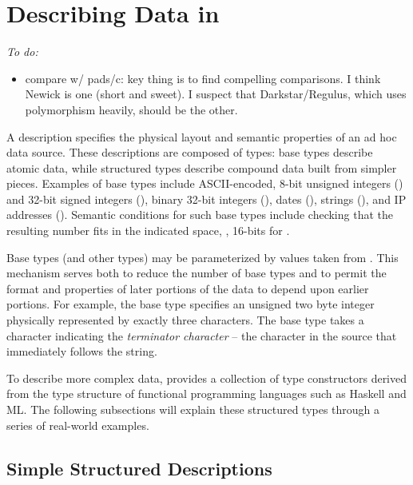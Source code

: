 \newcommand{\pvalue}{???}
\section{Describing Data in \padsmlbig{}}
\label{sec:padsml-overview}

{\em
To do:
\begin{itemize}
\item compare w/ pads/c: key thing is to find compelling
  comparisons. I think Newick is one (short and sweet). I suspect that
  Darkstar/Regulus, which uses polymorphism heavily, should be the other.
\end{itemize}
}

A \padsml{} description specifies the physical layout and semantic
properties of an ad hoc data source.  These descriptions are composed
of types: base types describe atomic data, while structured types
describe compound data built from simpler pieces.  Examples of base
types include ASCII-encoded, 8-bit unsigned integers () and
32-bit signed integers (), binary 32-bit integers (),
dates (), strings (), and IP addresses
().  Semantic conditions for such base types include checking
that the resulting number fits in the indicated space, \ie, 16-bits
for .

Base types (and other types) may be parameterized by values taken from
\ml{}.  This mechanism serves both to reduce the number of base types
and to permit the format and properties of later portions of the data
to depend upon earlier portions.  For example, the base type
 specifies an unsigned two byte integer physically
represented by exactly three characters. The base type 
takes a character indicating the \textit{terminator character} -- the
character in the source that immediately follows the string.

To describe more complex data, \padsml{} provides a collection of
type constructors derived from the type structure of functional
programming languages such as Haskell and ML.  The following
subsections will explain these structured types through a series 
of real-world examples.  


\subsection{Simple Structured Descriptions}


